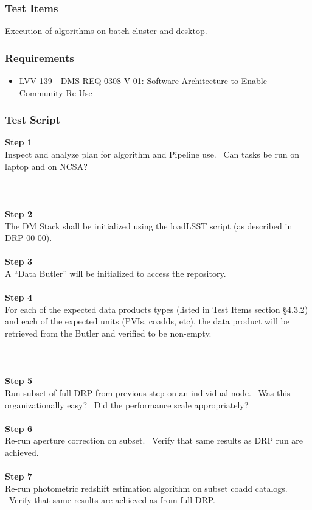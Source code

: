 \hypertarget{test-items-100}{%
\subsubsection{Test Items}\label{test-items-100}}

Execution of algorithms on batch cluster and desktop.

\hypertarget{requirements-101}{%
\subsubsection{Requirements}\label{requirements-101}}

\begin{itemize}
\tightlist
\item
  \href{https://jira.lsstcorp.org/browse/LVV-139}{LVV-139} -
  DMS-REQ-0308-V-01: Software Architecture to Enable Community Re-Use
\end{itemize}

\hypertarget{test-script-101}{%
\subsubsection{Test Script}\label{test-script-101}}

\textbf{Step 1}\\
Inspect and analyze plan for algorithm and Pipeline use. ~Can tasks be
run on laptop and on NCSA?\\
~\\
~\\
~\\
\textbf{Step 2}\\
The DM Stack shall be initialized using the loadLSST script (as
described in DRP-00-00).\\
~\\
\textbf{Step 3}\\
A ``Data Butler'' will be initialized to access the repository.\\
~\\
\textbf{Step 4}\\
For each of the expected data products types (listed in Test Items
section §4.3.2) and each of the expected units (PVIs, coadds, etc), the
data product will be retrieved from the Butler and verified to be
non-empty.\\
~\\
~\\
~\\
\textbf{Step 5}\\
Run subset of full DRP from previous step on an individual node. ~Was
this organizationally easy? ~Did the performance scale appropriately?\\
~\\
\textbf{Step 6}\\
Re-run aperture correction on subset. ~Verify that same results as DRP
run are achieved.\\
~\\
\textbf{Step 7}\\
Re-run photometric redshift estimation algorithm on subset coadd
catalogs. ~Verify that same results are achieved as from full DRP.\\
~\\

